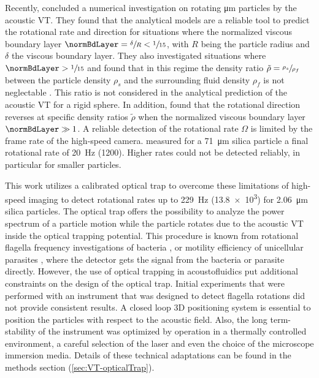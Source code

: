 Recently, \citeauthor{hahn2016} \cite{hahn2016} concluded a numerical 
investigation on rotating \si{\micro\meter} particles by the acoustic VT\@. They 
found that the analytical models are a reliable tool to predict the rotational 
rate and direction for situations where the normalized viscous boundary layer 
$\normBdLayer = \sfrac{\delta}{R} < \sfrac{1}{15}$, with $R$ being the particle 
radius and $\delta$ the viscous boundary layer. They also investigated 
situations where $\normBdLayer > \sfrac{1}{15}$ and found that in this regime 
the density ratio $\tilde{\rho} = \sfrac{\rho_{s}}{\rho_{f}}$ between the 
particle density $\rho_{s}$ and the surrounding fluid density $\rho_{f}$ is not 
neglectable \cite{hahn2016}. This ratio is not considered in the analytical 
prediction of the acoustic VT for a rigid sphere. In addition, 
\citeauthor{hahn2016} \cite{hahn2016} found that the rotational direction 
reverses at specific density ratios $\tilde{\rho}$ when the normalized viscous 
boundary layer $\normBdLayer \gg 1$. A reliable detection of the rotational rate 
$\Omega$ is limited by the frame rate of the high-speed camera.  
\citeauthor{Lamprecht} \cite{Lamprecht} measured for a \SI{71}{\micro\meter} 
silica particle a final rotational rate of \SI{20}{\hertz} (\SI{1200}{\rpm}).  
Higher rates could not be detected reliably, in particular for smaller 
particles.

This work utilizes a calibrated optical trap to overcome these limitations of 
high-speed imaging to detect rotational rates up to \SI{229}{\hertz} 
(\SI{13.8e3}{\rpm}) for \SI{2.06}{\micro\meter} silica particles. The optical 
trap offers the possibility to analyze the power spectrum of a particle motion 
while the particle rotates due to the acoustic VT inside the optical trapping 
potential.  This procedure is known from rotational flagella frequency 
investigations of bacteria \cite{kirchner2014direct}, or motility efficiency of 
unicellular parasites \cite{stellamanns2014optical}, where the detector gets the 
signal from the bacteria or parasite directly. However, the use of optical 
trapping in acoustofluidics put additional constraints on the design of the 
optical trap.  Initial experiments that were performed with an instrument that 
was designed to detect flagella rotations did not provide consistent results. A 
closed loop 3D positioning system is essential to position the particles with 
respect to the acoustic field. Also, the long term-stability of the instrument 
was optimized by operation in a thermally controlled environment, a careful 
selection of the laser and even the choice of the microscope immersion media.  
Details of these technical adaptations can be found in the methods section 
(\ref{sec:VT-opticalTrap}).

